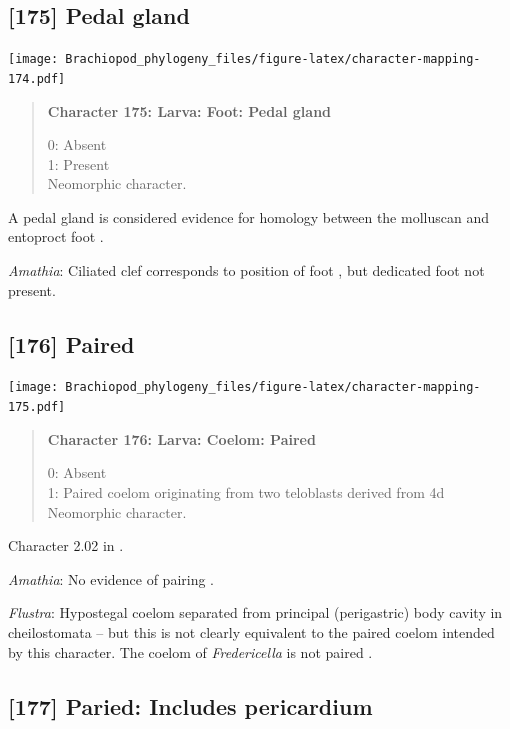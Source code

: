 \documentclass[openany]{book}
\begin{document}
\subsection*{{[}175{]} Pedal gland}\label{pedal-gland}

\texttt{[image: Brachiopod\_phylogeny\_files/figure-latex/character-mapping-174.pdf]}

\begin{quote}
\textbf{Character 175: Larva: Foot: Pedal gland}

0: Absent\\
1: Present\\
Neomorphic character.
\end{quote}

A pedal gland is considered evidence for homology between the molluscan
and entoproct foot \citep{Haszprunar2008}.

\hypertarget{Amathia-coding-175}{}
\emph{Amathia}: Ciliated clef corresponds to position of foot
\citep{Reed1982}, but dedicated foot not present.

\subsection*{{[}176{]} Paired}\label{paired}

\texttt{[image: Brachiopod\_phylogeny\_files/figure-latex/character-mapping-175.pdf]}

\begin{quote}
\textbf{Character 176: Larva: Coelom: Paired}

0: Absent\\
1: Paired coelom originating from two teloblasts derived from 4d\\
Neomorphic character.
\end{quote}

Character 2.02 in \citet{Scheltema1993}.

\hypertarget{Amathia-coding-176}{}
\emph{Amathia}: No evidence of pairing \citep{Reed1982}.

\hypertarget{Flustra-coding-176}{}
\emph{Flustra}: Hypostegal coelom separated from principal (perigastric)
body cavity in cheilostomata -- but this is not clearly equivalent to
the paired coelom intended by this character. The coelom of
\emph{Fredericella} is not paired \citep{Gruhl2010F}.

\subsection*{{[}177{]} Paried: Includes
pericardium}\label{paried-includes-pericardium}
\end{document}
